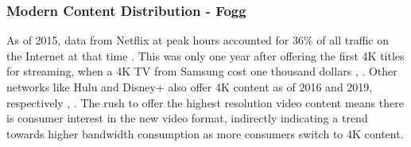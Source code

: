 \documentclass[journal]{IEEEtran}
\begin{document}
\subsubsection{Modern Content Distribution - Fogg}
As of 2015, data from Netflix at peak hours accounted for 36\% of all traffic on the Internet at that time \cite{spangler15}. This was only one year after offering the first 4K titles for streaming, when a 4K TV from Samsung cost one thousand dollars \cite{netflixadds4k}, \cite{tvprice}. Other networks like Hulu and Disney+ also offer 4K content as of 2016 and 2019, respectively \cite{hulu4k}, \cite{displus4k}. The rush to offer the highest resolution video content means there is consumer interest in the new video format, indirectly indicating a trend towards higher bandwidth consumption as more consumers switch to 4K content.
\end{document}
